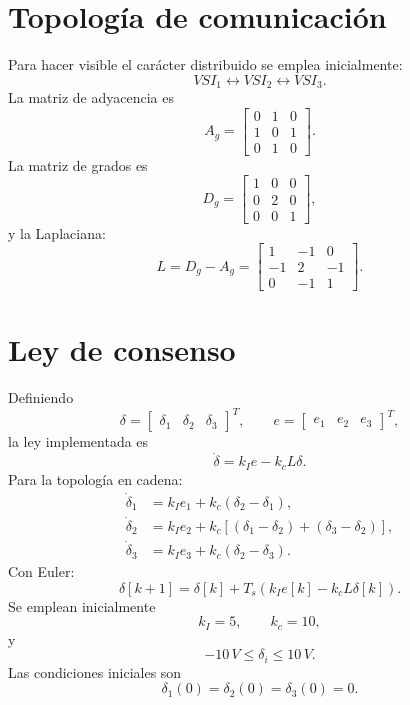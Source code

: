 \documentclass[12pt,a4paper]{article}
\begin{document}
\section{Topología de comunicación}
Para hacer visible el carácter distribuido se emplea inicialmente:
\begin{equation}
VSI_1\longleftrightarrow VSI_2\longleftrightarrow VSI_3.
\end{equation}
La matriz de adyacencia es
\begin{equation}
\boxed{
A_g=\begin{bmatrix}0&1&0\\1&0&1\\0&1&0\end{bmatrix}}.
\end{equation}
La matriz de grados es
\begin{equation}
D_g=\begin{bmatrix}1&0&0\\0&2&0\\0&0&1\end{bmatrix},
\end{equation}
y la Laplaciana:
\begin{equation}
\boxed{
L=D_g-A_g=
\begin{bmatrix}1&-1&0\\-1&2&-1\\0&-1&1\end{bmatrix}}.
\end{equation}

\section{Ley de consenso}
Definiendo
\begin{equation}
\delta=\begin{bmatrix}\delta_1&\delta_2&\delta_3\end{bmatrix}^{T},\qquad
e=\begin{bmatrix}e_1&e_2&e_3\end{bmatrix}^{T},
\end{equation}
la ley implementada es
\begin{equation}
\boxed{\dot{\delta}=k_Ie-k_cL\delta}.
\end{equation}
Para la topología en cadena:
\begin{align}
\dot{\delta}_1&=k_Ie_1+k_c(\delta_2-\delta_1),\\
\dot{\delta}_2&=k_Ie_2+k_c[(\delta_1-\delta_2)+(\delta_3-\delta_2)],\\
\dot{\delta}_3&=k_Ie_3+k_c(\delta_2-\delta_3).
\end{align}
Con Euler:
\begin{equation}
\boxed{\delta[k+1]=\delta[k]+T_s(k_Ie[k]-k_cL\delta[k])}.
\end{equation}
Se emplean inicialmente
\begin{equation}
k_I=5,\qquad k_c=10,
\end{equation}
y
\begin{equation}
-10\,V\leq\delta_i\leq10\,V.
\end{equation}
Las condiciones iniciales son
\begin{equation}
\delta_1(0)=\delta_2(0)=\delta_3(0)=0.
\end{equation}
\end{document}
